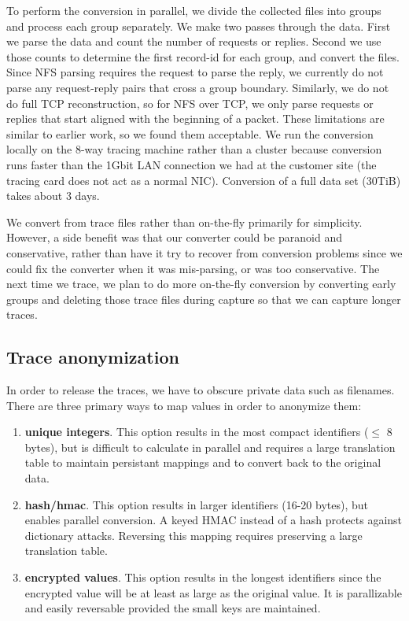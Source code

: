 To perform the conversion in parallel, we divide the collected files
into groups and process each group separately.  We make two passes
through the data.  First we parse the data and count the number of
requests or replies.  Second we use those counts to determine the
first record-id for each group, and convert the files.  Since NFS
parsing requires the request to parse the reply, we currently do not
parse any request-reply pairs that cross a group boundary.  Similarly,
we do not do full TCP reconstruction, so for NFS over TCP, we only
parse requests or replies that start aligned with the beginning of a
packet. These limitations are similar to earlier work, so we found
them acceptable.   We run the conversion locally on the 8-way tracing
machine rather than a cluster because conversion runs faster than the
1Gbit LAN connection we had at the customer site (the tracing card
does not act as a normal NIC).  Conversion of a full data set (30TiB)
takes about 3 days.

We convert from trace files rather than on-the-fly primarily for
simplicity.  However, a side benefit was that our converter could be
paranoid and conservative, rather than have it try to recover from
conversion problems since we could fix the converter when it was
mis-parsing, or was too conservative.  The next time we trace, we plan
to do more on-the-fly conversion by converting early groups and
deleting those trace files during capture so that we can capture
longer traces.

\subsection{Trace anonymization}

In order to release the traces, we have to obscure private data such
as filenames.  There are three primary ways to map values in order to
anonymize them:

\begin{enumerate}

\item {\bf unique integers}.  This option results in the
most compact identifiers ($\leq$ 8 bytes), but is difficult to
calculate in parallel and requires a large translation table to
maintain persistant mappings and to convert back to the original data.

\item {\bf hash/hmac}.  This option results in larger
identifiers (16-20 bytes), but enables parallel conversion.  A keyed HMAC instead of a hash
protects against dictionary attacks.  Reversing this mapping requires
preserving a large translation table.

\item {\bf encrypted values}.  This option results in
the longest identifiers since the encrypted value will be at least as
large as the original value.  It is parallizable and easily reversable
provided the small keys are maintained.

\end{enumerate}

